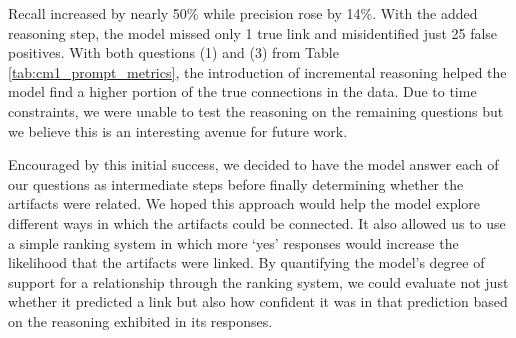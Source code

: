 
Recall increased by nearly 50\% while precision rose by 14\%. With the added reasoning step, the model missed only 1 true link and misidentified just 25 false positives. With both questions (1) and (3) from Table \ref{tab:cm1_prompt_metrics}, the introduction of incremental reasoning helped the model find a higher portion of the true connections in the data. Due to time constraints, we were unable to test the reasoning on the remaining questions but we believe this is an interesting avenue for future work.

Encouraged by this initial success, we decided to have the model answer each of our questions as intermediate steps before finally determining whether the artifacts were related. We hoped this approach would help the model explore different ways in which the artifacts could be connected. It also allowed us to use a simple ranking system in which more `yes' responses would increase the likelihood that the artifacts were linked. By quantifying the model's degree of support for a relationship through the ranking system, we could evaluate not just whether it predicted a link but also how confident it was in that prediction based on the reasoning exhibited in its responses. 


